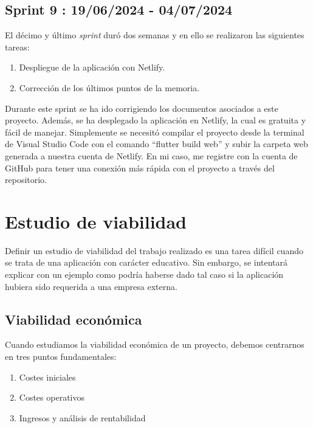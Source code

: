 \subsection{Sprint 9 : 19/06/2024 - 04/07/2024}

	El décimo y último \emph{sprint} duró dos semanas y en ello se realizaron las siguientes tareas:
	\begin{enumerate}
		\item Despliegue de la aplicación con Netlify.
		\item Corrección de los últimos puntos de la memoria.
	\end{enumerate}
	
	Durante este sprint se ha ido corrigiendo los documentos asociados a este proyecto. Además, se ha desplegado la aplicación en Netlify, la cual es gratuita y fácil de manejar. Simplemente se necesitó compilar el proyecto desde la terminal de Visual Studio Code con el comando ``flutter build web'' y subir la carpeta web generada a nuestra cuenta de Netlify. En mi caso, me registre con la cuenta de GitHub para tener una conexión más rápida con el proyecto a través del repositorio. 
	
\section{Estudio de viabilidad}

	Definir un estudio de viabilidad del trabajo realizado es una tarea difícil cuando se trata de una aplicación con carácter educativo. Sin embargo, se intentará explicar con un ejemplo como podría haberse dado tal caso si la aplicación hubiera sido requerida a una empresa externa.

\subsection{Viabilidad económica}
	
	Cuando estudiamos la viabilidad económica de un proyecto, debemos centrarnos en tres puntos fundamentales:
	\begin{enumerate}
		\item Costes iniciales
		\item Costes operativos
		\item Ingresos y análisis de rentabilidad
	\end{enumerate}
	
